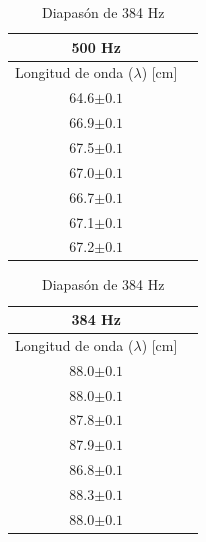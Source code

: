 \documentclass[10pt,a4paper]{article}
\begin{document}
\begin{table}[H]
    \centering
\begin{minipage}[t]{0.48\linewidth}\centering
\caption{Diapasón de 500 Hz}
\begin{tabular}{ c c }
\toprule
500 Hz   \\
\midrule
Longitud de onda ($\lambda$) [cm]     \\
64.6$\pm0.1$      \\
66.9$\pm0.1$     \\
67.5$\pm0.1$     \\
67.0$\pm0.1$     \\
66.7$\pm0.1$     \\
67.1$\pm0.1$     \\
67.2$\pm0.1$     \\
\bottomrule
\end{tabular}
\end{minipage}\hfill%
\begin{minipage}[t]{0.48\linewidth}\centering
\caption{Diapasón de 384 Hz}
\label{tab:The parameters 2 }
\begin{tabular}{ c c }
\toprule
384 Hz   \\
\midrule
Longitud de onda ($\lambda$) [cm]     \\
88.0$\pm0.1$     \\
88.0$\pm0.1$     \\
87.8$\pm0.1$     \\
87.9$\pm0.1$     \\
86.8$\pm0.1$     \\
88.3$\pm0.1$     \\
88.0$\pm0.1$     \\
\bottomrule
\end{tabular}
\end{minipage}
\end{table}
\end{document}
